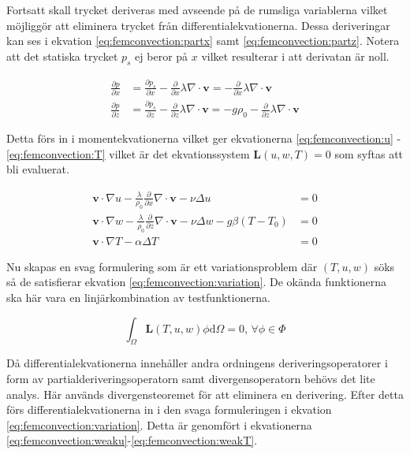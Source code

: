 \noindent
Fortsatt skall trycket deriveras med avseende på de rumsliga variablerna vilket möjliggör
att eliminera trycket från differentialekvationerna. Dessa deriveringar kan ses i ekvation
\eqref{eq:femconvection:partx} samt \eqref{eq:femconvection:partz}.
Notera att det statiska trycket
$p_s$ ej beror på $x$ vilket resulterar i att derivatan är noll.

\begin{align}
\label{eq:femconvection:partx}
\frac{\partial p}{\partial x} &= \frac{\partial p_s}{\partial x} -
\frac{\partial}{\partial x} \lambda\nabla\cdot\mathbf{v} = -
\frac{\partial}{\partial x} \lambda\nabla\cdot\mathbf{v}
\\
\label{eq:femconvection:partz}
\frac{\partial p}{\partial z} &= \frac{\partial p_s}{\partial z} -
\frac{\partial}{\partial z} \lambda\nabla\cdot\mathbf{v} =
-g\rho_0 - \frac{\partial}{\partial z} \lambda\nabla\cdot\mathbf{v}
\end{align}

\noindent
Detta förs in i momentekvationerna vilket ger ekvationerna \eqref{eq:femconvection:u} -
\eqref{eq:femconvection:T} vilket är det ekvationssystem $\mathbf{L}(u,w,T) = 0$
som syftas att bli evaluerat.

\begin{align}
\label{eq:femconvection:u}
\mathbf{v}\cdot\nabla u -
\frac{\lambda}{\rho_0}\frac{\partial}{\partial x}\nabla\cdot\mathbf{v} -\nu\Delta u &= 0
\\
\label{eq:femconvection:w}
\mathbf{v}\cdot\nabla w -
\frac{\lambda}{\rho_0}\frac{\partial}{\partial z}\nabla\cdot\mathbf{v}
- \nu\Delta w - g\beta(T-T_0) &= 0 \\ 
\label{eq:femconvection:T}
\mathbf{v}\cdot\nabla T - \alpha\Delta T &= 0
\end{align}

\noindent
Nu skapas en svag formulering som är ett variationsproblem där $(T,u,w)$ söks
så de satisfierar ekvation \eqref{eq:femconvection:variation}. De okända funktionerna
ska här vara en linjärkombination av testfunktionerna.

\begin{equation}
\label{eq:femconvection:variation}
\int_\Omega \mathbf{L}(T,u,w) \phi \mathrm{d}\Omega = 0\mbox{,  } \forall \phi \in \Phi
\end{equation}

\noindent
Då differentialekvationerna innehåller andra ordningens deriveringsoperatorer i form av
partialderiveringsoperatorn samt divergensoperatorn behövs det lite analys.
Här används divergensteoremet för att eliminera en derivering. Efter detta
förs differentialekvationerna in i den svaga formuleringen i ekvation
\eqref{eq:femconvection:variation}.
Detta är genomfört i 
ekvationerna \eqref{eq:femconvection:weaku}-\eqref{eq:femconvection:weakT}.

